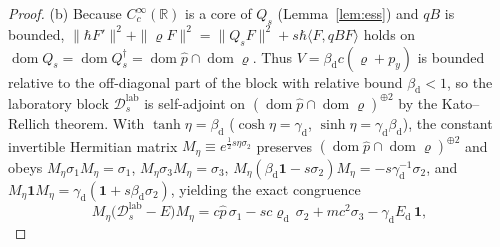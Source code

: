 \documentclass[aps,prd,onecolumn,tightenlines,nofootinbib,notitlepage,11pt,floatfix]{revtex4-2}
\theoremstyle{indentedtheorem}
\begin{document}
\begin{proof}
(b) Because $C_c^\infty(\mathbb{R})$ is a core of $Q_s$ (Lemma~\ref{lem:ess}) and $qB$ is bounded, $\|\hbar F'\|^2+\|\varrho F\|^2=\|Q_sF\|^2+s\hbar\langle F,qBF\rangle$ holds on $\operatorname{dom}Q_s=\operatorname{dom}Q_s^\dagger=\operatorname{dom}\hat{p}\cap\operatorname{dom}\varrho$. Thus $V=\beta_\text{d}c(\varrho+p_y)$ is bounded relative to the off-diagonal part of the block with relative bound $\beta_\text{d}<1$, so the laboratory block $\mathcal{D}_s^\text{lab}$ is self-adjoint on $(\operatorname{dom}\hat{p}\cap\operatorname{dom}\varrho)^{\oplus 2}$ by the Kato--Rellich theorem. With $\tanh\eta=\beta_\text{d}$ ($\cosh\eta=\gamma_\text{d}$, $\sinh\eta=\gamma_\text{d}\beta_\text{d}$), the constant invertible Hermitian matrix $M_\eta\equiv e^{\frac{1}{2}s\eta\sigma_2}$ preserves $(\operatorname{dom}\hat{p}\cap\operatorname{dom}\varrho)^{\oplus 2}$ and obeys $M_\eta\sigma_1 M_\eta=\sigma_1$, $M_\eta\sigma_3 M_\eta=\sigma_3$, $M_\eta(\beta_\text{d}\mathbf{1}-s\sigma_2)M_\eta=-s\gamma_\text{d}^{-1}\sigma_2$, and $M_\eta\mathbf{1}M_\eta=\gamma_\text{d}(\mathbf{1}+s\beta_\text{d}\sigma_2)$, yielding the exact congruence
\begin{equation*}
    M_\eta\big(\mathcal{D}_s^\text{lab}-E\big)M_\eta = c\hat{p}\,\sigma_1 - sc\varrho_\text{d}\,\sigma_2 + mc^2\sigma_3 - \gamma_\text{d}E_\text{d}\,\mathbf{1} ,
\end{equation*}

\end{proof}
\end{document}
